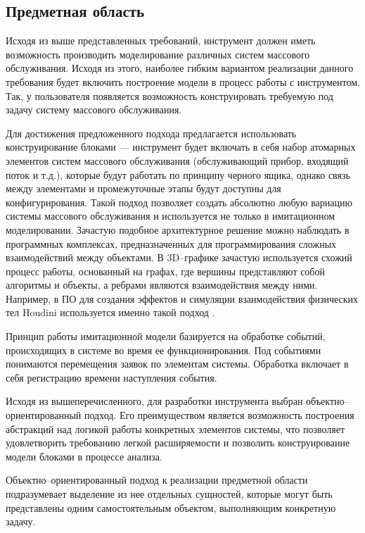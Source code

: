 \subsection{Предметная область}
Исходя из выше представленных требований, инструмент должен иметь возможность производить моделирование различных систем массового обслуживания. Исходя из этого, наиболее гибким вариантом реализации данного требования будет включить построение модели в процесс работы с инструментом. Так, у пользователя появляется возможность конструировать требуемую под задачу систему массового обслуживания.

Для достижения предложенного подхода предлагается использовать конструирование блоками \cite{valentin2002simulation} --- инструмент будет включать в себя набор атомарных элементов систем массового обслуживания (обслуживающий прибор, входящий поток и т.д.), которые будут работать по принципу черного ящика, однако связь между элементами и промежуточные этапы будут доступны для конфигурирования. Такой подход позволяет создать абсолютно любую вариацию системы массового обслуживания и используется не только в имитационном моделировании. Зачастую подобное архитектурное решение можно наблюдать в программных комплексах, предназначенных для программирования сложных взаимодействий между объектами. В 3D--графике зачастую используется схожий процесс работы, основанный на графах, где вершины представляют собой алгоритмы и объекты, а ребрами являются взаимодействия между ними. Например, в ПО для создания эффектов и симуляции взаимодействия физических тел Houdini используется именно такой подход \cite{claes2009controlling}.

Принцип работы имитационной модели базируется на обработке событий, происходящих в системе во время ее функционирования. Под событиями понимаются перемещения заявок по элементам системы. Обработка включает в себя регистрацию времени наступления события.

Исходя из вышеперечисленного, для разработки инструмента выбран объектно--ориентированный подход. Его преимуществом является возможность построения абстракций над логикой работы конкретных элементов системы, что позволяет удовлетворить требованию легкой расширяемости и позволить конструирование модели блоками в процессе анализа. 

Объектно--ориентированный подход \cite{fowler1997analysis} к реализации предметной области подразумевает выделение из нее отдельных сущностей, которые могут быть представлены одним самостоятельным объектом, выполняющим конкретную задачу.

